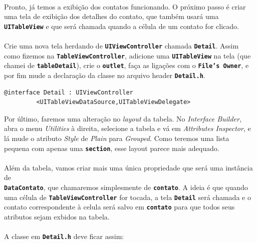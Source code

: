 \documentclass[a4paper,12pt,brazil,doubleside]{book}
\begin{document}
\paragraph{}Pronto, já temos a exibição dos contatos funcionando. O próximo passo é criar uma tela de exibição dos detalhes do contato, que também usará uma \texttt{\textbf{UITableView}} e que será chamada quando a célula de um contato for clicado.
\paragraph{}Crie uma nova tela herdando de \texttt{\textbf{UIViewController}} chamada \texttt{\textbf{Detail}}. Assim como fizemos na \texttt{\textbf{TableViewController}}, adicione uma \texttt{\textbf{UITableView}} na tela (que chamei de \texttt{\textbf{tableDetail}}), crie o \texttt{\textbf{outlet}}, faça as ligações com o \texttt{\textbf{File's Owner}}, e por fim mude a declaração da classe no arquivo header \texttt{\textbf{Detail.h}}.

\begin{listing}
\begin{verbatim}
@interface Detail : UIViewController
         <UITableViewDataSource,UITableViewDelegate>
\end{verbatim}
\end{listing}

Por último, faremos uma alteração no \emph{layout} da tabela. No \emph{Interface Builder}, abra o menu \emph{Utilities} à direita, selecione a tabela e vá em \emph{Attributes Inspector}, e lá mude o atributo \emph{Style} de \emph{Plain} para \emph{Grouped}. Como teremos uma lista pequena com apenas uma \texttt{\textbf{section}}, esse layout parece mais adequado.
\paragraph{}Além da tabela, vamos criar mais uma única propriedade que será uma instância de\\
\texttt{\textbf{DataContato}}, que chamaremos simplesmente de \texttt{\textbf{contato}}. A ideia é que quando uma célula de \texttt{\textbf{TableViewController}} for tocada, a tela \texttt{\textbf{Detail}} será chamada e o contato correspondente à celula será salvo em \texttt{\textbf{contato}} para que todos seus atributos sejam exbidos na tabela.

\pagebreak

\paragraph{}A classe em \texttt{\textbf{Detail.h}} deve ficar assim:
\end{document}
